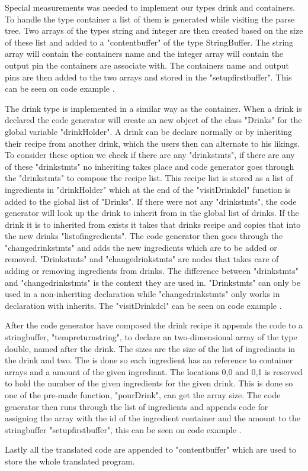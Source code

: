 Special measurements was needed to implement our types drink and containers. To handle the type container a list of them is generated while visiting the parse tree. Two arrays of the types string and integer are then created based on the size of these list and added to a "contentbuffer" of the type StringBuffer. The string array will contain the containers name and the integer array will contain the output pin the containers are associate with. The containers name and output pins are then added to the two arrays and stored in the "setupfirstbuffer". This can be seen on code example .

The drink type is implemented in a similar way as the container. When a drink is declared the code generator will create an new object of the class "Drinks" for the global variable "drinkHolder". A drink can be declare normally or by inheriting their recipe from another drink, which the users then can alternate to his likings. To consider these option we check if there are any "drinkstmts", if there are any of these "drinkstmts" no inheriting takes place and code generator goes through the "drinkstmts" to compose the recipe list. This recipe list is stored as a list of ingredients in "drinkHolder" which at the end of the "visitDrinkdcl" function is added to the global list of "Drinks". If there were not any "drinkstmts", the code generator will look up the drink to inherit from in the global list of drinks. If the drink it is to inherited from exists it takes that drinks recipe and copies that into the new drinks "listofingredients". The code generator then goes through the "changedrinkstmts" and adds the new ingredients which are to be added or removed. "Drinkstmts" and "changedrinkstmts" are nodes that takes care of adding or removing ingredients from drinks. The difference between "drinkstmts" and "changedrinkstmts" is the context they are used in. "Drinkstmts" can only be used in a non-inheriting declaration while "changedrinkstmts" only works in declaration with inherits. The "visitDrinkdcl" can be seen on code example .

After the code generator have composed the drink recipe it appends the code to a stringbuffer, "tempreturnstring", to declare an two-dimensional array of the type double, named after the drink. The sizes are the size of the list of ingrediants in the drink and two. The is done so each ingredient has an reference to container arrays and a amount of the given ingrediant. The locations 0,0 and 0,1 is reserved to hold the number of the given ingredients for the given drink. This is done so one of the pre-made function, "pourDrink", can get the array size. The code generator then runs through the list of ingredients and appends code for assigning the array with the id of the ingredient container and the amount to the stringbuffer "setupfirstbuffer", this can be seen on code example .

Lastly all the translated code are appended to "contentbuffer" which are used to store the whole translated program.